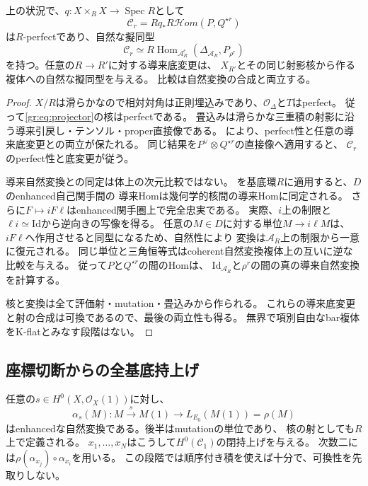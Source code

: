 \begin{theorem}[真の導来Natのperfect模型]\label{gr:thm:perfect-target}
上の状況で、$q:X\times_R X\to\operatorname{Spec}R$として
\[
 \mathcal C_r=Rq_*R\mathcal Hom(P,Q^{\star r})
 \tag{GR4}\label{gr:eq:nat-complex}
\]
は$R$-perfectであり、自然な擬同型
\[
 \mathcal C_r\simeq R\operatorname{Hom}_{\mathcal A_R^e}
       (\Delta_{\mathcal A_R},P_{\rho^r})
\]
を持つ。任意の$R\to R'$に対する導来底変更は、
$X_{R'}$とその同じ射影核から作る複体への自然な擬同型を与える。
比較は自然変換の合成と両立する。
\end{theorem}
\begin{proof}
$X/R$は滑らかなので相対対角は正則埋込みであり、$\mathcal O_\Delta$と$T$はperfect。
従って\eqref{gr:eq:projector}の核はperfectである。
畳込みは滑らかな三重積の射影に沿う導来引戻し・テンソル・proper直接像である。
\cite[Tag~0B91]{GRStacks}により、perfect性と任意の導来底変更との両立が保たれる。
同じ結果を$P^\vee\otimes Q^{\star r}$の直接像へ適用すると、
$\mathcal C_r$のperfect性と底変更が従う。

導来自然変換との同定は体上の次元比較ではない。
\cite[Theorem~8.15]{GRToen}を基底環$R$に適用すると、$D$のenhanced自己関手間の
導来Homは幾何学的核間の導来Homに同定される。
さらに$F\mapsto iF\ell$はenhanced関手圏上で完全忠実である。
実際、$i$上の制限と$\ell i\simeq\mathrm{Id}$から逆向きの写像を得る。
任意の$M\in D$に対する単位$M\to i\ell M$は、
$iF\ell$へ作用させると同型になるため、自然性により
変換は$\mathcal A_R$上の制限から一意に復元される。
同じ単位と三角恒等式はcoherent自然変換複体上の互いに逆な比較を与える。
従って$P$と$Q^{\star r}$の間のHomは、
$\mathrm{Id}_{\mathcal A_R}$と$\rho^r$の間の真の導来自然変換を計算する。

核と変換は全て評価射・mutation・畳込みから作られる。
これらの導来底変更と射の合成は可換であるので、最後の両立性も得る。
無界で項別自由なbar複体をK-flatとみなす段階はない。
\end{proof}

\subsection{座標切断からの全基底持上げ}

任意の$s\in H^0(X,\mathcal O_X(1))$に対し、
\[
 \alpha_s(M):M\xrightarrow{\,s\,}M(1)
       \longrightarrow L_{E_0}(M(1))=\rho(M)
 \tag{GR5}\label{gr:eq:sections}
\]
はenhancedな自然変換である。後半はmutationの単位であり、
核の射としても$R$上で定義される。
$x_1,\ldots,x_N$はこうして$H^0(\mathcal C_1)$の閉持上げを与える。
次数二には$\rho(\alpha_{x_j})\circ\alpha_{x_i}$を用いる。
この段階では順序付き積を使えば十分で、可換性を先取りしない。

